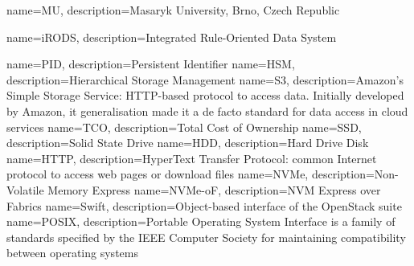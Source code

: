 {
    name=MU,
    description={Masaryk University, Brno, Czech Republic}
}


{
    name=iRODS,
    description={Integrated Rule-Oriented Data System}
}

{
    name=PID,
    description={Persistent Identifier}
}
{
    name=HSM,
    description={Hierarchical Storage Management}
}
{
    name=S3,
    description={Amazon's Simple Storage Service: HTTP-based protocol to access data. Initially developed by Amazon, it generalisation made it a de facto standard for data access in cloud services}
}
{
    name=TCO,
    description={Total Cost of Ownership}
}
{
    name=SSD,
    description={Solid State Drive}
}
{
    name=HDD,
    description={Hard Drive Disk}
}
{
    name=HTTP,
    description={HyperText Transfer Protocol: common Internet protocol to access web pages or download files}
}
{
    name=NVMe,
    description={Non-Volatile Memory Express}
}
{
    name=NVMe-oF,
    description={NVM Express over Fabrics}
}
{
    name=Swift,
    description={Object-based interface of the OpenStack suite}
}
{
    name=POSIX,
    description={Portable Operating System Interface is a family of standards specified by the IEEE Computer Society for maintaining compatibility between operating systems}
}




